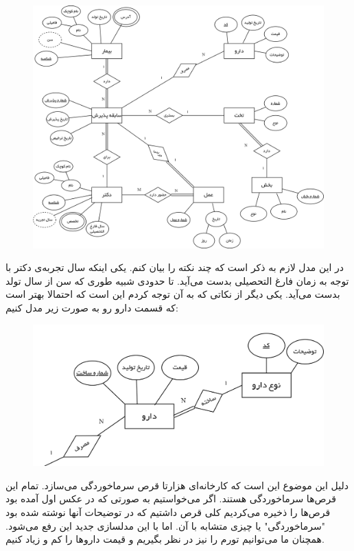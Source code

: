 \begin{figure}[H]
    \centering \includegraphics[scale=0.17]{pics/Hospital-ER.png}
\end{figure}
\noindent
در این مدل لازم به ذکر است که چند نکته را بیان کنم.
یکی اینکه سال تجربه‌ی دکتر با توجه به زمان فارغ التحصیلی بدست می‌آید. تا حدودی شبیه طوری که سن
از سال تولد بدست می‌آید.
یکی دیگر از نکاتی که به آن توجه کردم این است که احتمالا بهتر است که قسمت دارو رو به صورت زیر مدل کنیم:
\begin{figure}[H]
    \centering \includegraphics[scale=0.3]{pics/HospitalER-ER-Fixed.png}
\end{figure}
\noindent
دلیل این موضوع این است که کارخانه‌ای هزارتا قرص سرماخوردگی می‌سازد. تمام این قرص‌ها سرماخوردگی هستند.
اگر می‌خواستیم به صورتی که در عکس اول آمده بود قرص‌ها را ذخیره می‌کردیم کلی قرص داشتیم که در توضیحات
آنها نوشته شده بود
"سرماخوردگی"
یا چیزی متشابه با آن.
اما با این مدلسازی جدید این
رفع می‌شود. همچنان ما می‌توانیم تورم را نیز در نظر بگیریم و قیمت دارو‌ها را کم و زیاد کنیم.